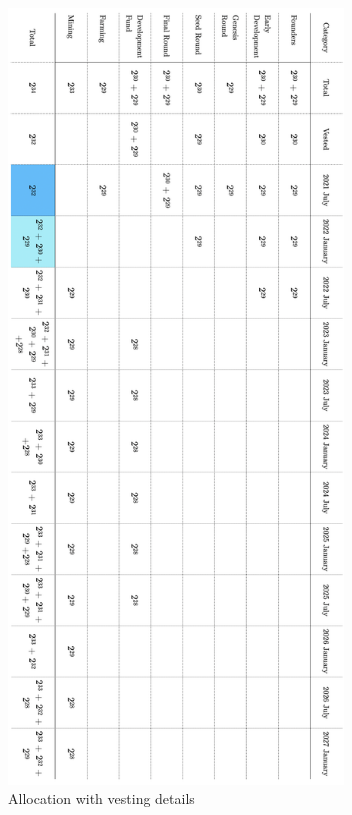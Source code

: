 \documentclass[12pt]{article}
\begin{document}
\begin{figure}[H]
\centering
  \includegraphics[width=3.5in]{images/allocation_table.png}
  \caption{Allocation with vesting details}
  \label{fig:allocation_table}
\end{figure}

 \thispagestyle{empty} 
\end{document}
